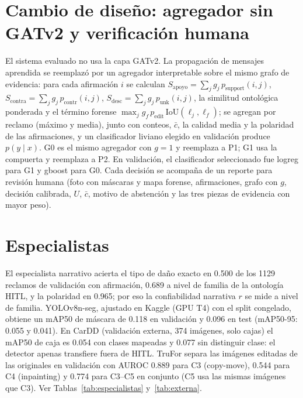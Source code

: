 
\section{Cambio de diseño: agregador sin GATv2 y verificación humana}

El sistema evaluado no usa la capa GATv2. La propagación de mensajes aprendida se reemplazó por un
agregador interpretable sobre el mismo grafo de evidencia: para cada afirmación $i$ se calculan
$S_{\text{apoyo}}=\sum_j g_j\,p_{\text{support}}(i,j)$, $S_{\text{contra}}=\sum_j g_j\,p_{\text{contr}}(i,j)$,
$S_{\text{desc}}=\sum_j g_j\,p_{\text{unk}}(i,j)$, la similitud ontológica ponderada y el término forense
$\max_j g_f\,p_{\text{edit}}\,\mathrm{IoU}(\ell_j,\ell_f)$; se agregan por reclamo (máximo y media), junto con conteos,
$\bar c$, la calidad media y la polaridad de las afirmaciones, y un clasificador liviano elegido en validación produce
$p(y\mid x)$. G0 es el mismo agregador con $g=1$ y reemplaza a P1; G1 usa la compuerta y reemplaza a P2. En validación,
el clasificador seleccionado fue logreg para G1 y gboost para G0. Cada decisión se acompaña de un
reporte para revisión humana (foto con máscaras y mapa forense, afirmaciones, grafo con $g$, decisión calibrada,
$U$, $\bar c$, motivo de abstención y las tres piezas de evidencia con mayor peso).

\section{Especialistas}

El especialista narrativo acierta el tipo de daño exacto en 0.500 de los
1129 reclamos de validación con afirmación, 0.689 a nivel de
familia de la ontología HITL, y la polaridad en 0.965; por eso la confiabilidad narrativa $r$ se mide a nivel
de familia. YOLOv8n-seg, ajustado en Kaggle (GPU T4) con el split congelado, obtiene un mAP50 de máscara de
0.118 en validación y 0.096 en test (mAP50-95: 0.055 y
0.041). En CarDD (validación externa, 374 imágenes, solo cajas) el mAP50 de caja es
0.054 con clases mapeadas y 0.077 sin distinguir clase: el detector apenas
transfiere fuera de HITL. TruFor separa las imágenes editadas de las originales en validación con AUROC
0.889 para C3 (copy-move), 0.544 para C4 (inpainting) y 0.774
para C3--C5 en conjunto (C5 usa las mismas imágenes que C3). Ver Tablas~\ref{tab:especialistas} y~\ref{tab:externa}.

